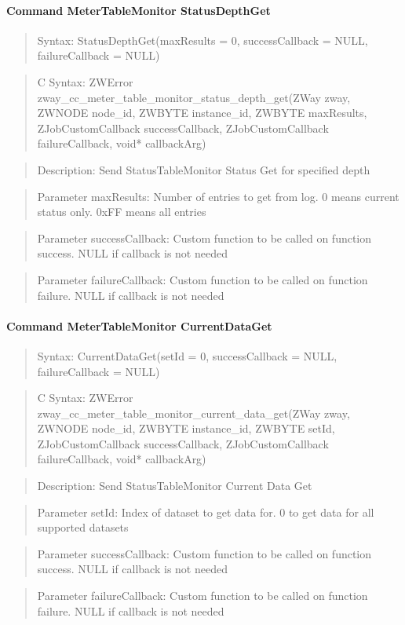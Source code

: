 \paragraph{Command MeterTableMonitor StatusDepthGet}
\begin{quote}Syntax: StatusDepthGet(maxResults = 0, successCallback = NULL, failureCallback = NULL)\end{quote}
\begin{quote}C Syntax: ZWError zway\_cc\_meter\_table\_monitor\_status\_depth\_get(ZWay zway, ZWNODE node\_id, ZWBYTE instance\_id, ZWBYTE maxResults, ZJobCustomCallback successCallback, ZJobCustomCallback failureCallback, void* callbackArg)\end{quote}
\begin{quote}Description: Send StatusTableMonitor Status Get for specified depth\end{quote}
\begin{quote}Parameter maxResults: Number of entries to get from log. 0 means current status only. 0xFF means all entries\end{quote}
\begin{quote}Parameter successCallback: Custom function to be called on function success. NULL if callback is not needed\end{quote}
\begin{quote}Parameter failureCallback: Custom function to be called on function failure. NULL if callback is not needed\end{quote}


\paragraph{Command MeterTableMonitor CurrentDataGet}
\begin{quote}Syntax: CurrentDataGet(setId = 0, successCallback = NULL, failureCallback = NULL)\end{quote}
\begin{quote}C Syntax: ZWError zway\_cc\_meter\_table\_monitor\_current\_data\_get(ZWay zway, ZWNODE node\_id, ZWBYTE instance\_id, ZWBYTE setId, ZJobCustomCallback successCallback, ZJobCustomCallback failureCallback, void* callbackArg)\end{quote}
\begin{quote}Description: Send StatusTableMonitor Current Data Get\end{quote}
\begin{quote}Parameter setId: Index of dataset to get data for. 0 to get data for all supported datasets\end{quote}
\begin{quote}Parameter successCallback: Custom function to be called on function success. NULL if callback is not needed\end{quote}
\begin{quote}Parameter failureCallback: Custom function to be called on function failure. NULL if callback is not needed\end{quote}



